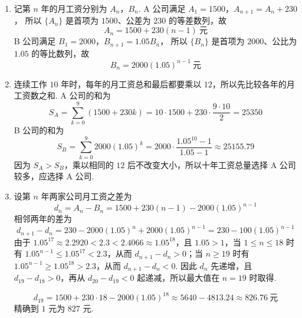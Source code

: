 \begin{solution}
\begin{enumerate}
\item 记第 \(n\) 年的月工资分别为 \(A_n\)，\(B_n\). A 公司满足
\(A_1=1500\)，\(A_{n+1}=A_n+230\)，
所以 \(\{A_n\}\) 是首项为 \(1500\)、公差为 \(230\) 的等差数列，故
\[
A_n=1500+230(n-1)\ \text{元}
\]
B 公司满足
\(B_1=2000\)，\(B_{n+1}=1.05B_n\)，
所以 \(\{B_n\}\) 是首项为 \(2000\)、公比为 \(1.05\) 的等比数列，故
\[
B_n=2000(1.05)^{n-1}\ \text{元}
\]

\item 连续工作 \(10\) 年时，每年的月工资总和最后都要乘以 \(12\)，所以先比较各年的月工资数之和. A 公司的和为
\[
S_A=\sum_{k=0}^{9}(1500+230k)
=10\cdot1500+230\cdot\frac{9\cdot10}{2}
=25350
\]
B 公司的和为
\[
S_B=\sum_{k=0}^{9}2000(1.05)^k
=2000\cdot\frac{1.05^{10}-1}{1.05-1}
\approx25155.79
\]
因为 \(S_A>S_B\)，乘以相同的 \(12\) 后不改变大小，所以十年工资总量选择 A 公司较多，应选择 A 公司.


\item 设第 \(n\) 年两家公司月工资之差为
\[
d_n=A_n-B_n=1500+230(n-1)-2000(1.05)^{n-1}
\]
相邻两年的差为
\[
d_{n+1}-d_n=230-2000(1.05)^n+2000(1.05)^{n-1}
=230-100(1.05)^{n-1}
\]
由于 \(1.05^{17}\approx2.2920<2.3<2.4066\approx1.05^{18}\)，且 \(1.05>1\)，当 \(1\leqslant n\leqslant18\) 时有 \(1.05^{n-1}\leqslant1.05^{17}<2.3\)，从而 \(d_{n+1}-d_n>0\)；当 \(n\geqslant19\) 时有 \(1.05^{n-1}\geqslant1.05^{18}>2.3\)，从而 \(d_{n+1}-d_n<0\). 因此 \(d_n\) 先递增，且 \(d_{19}-d_{18}>0\)，再从 \(d_{20}-d_{19}<0\) 起递减，所以最大值在 \(n=19\) 时取得.


\[
d_{19}=1500+230\cdot18-2000(1.05)^{18}
\approx5640-4813.24
\approx826.76\ \text{元}
\]
精确到 \(1\) 元为 \(827\) 元.
\end{enumerate}
\end{solution}
